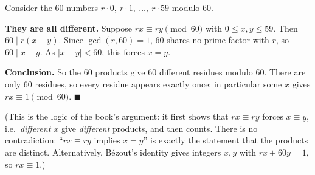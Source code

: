Consider the $60$ numbers $r\cdot0,\ r\cdot1,\ \ldots,\ r\cdot59$ modulo $60$.

\textbf{They are all different.} Suppose $rx\equiv ry\pmod{60}$ with $0\le x,y\le59$. Then $60\mid r(x-y)$. Since $\gcd(r,60)=1$, $60$ shares no prime factor with $r$, so $60\mid x-y$. As $|x-y|<60$, this forces $x=y$.

\textbf{Conclusion.} So the $60$ products give $60$ different residues modulo $60$. There are only $60$ residues, so every residue appears exactly once; in particular some $x$ gives $rx\equiv1\pmod{60}$. $\blacksquare$

(This is the logic of the book's argument: it first shows that $rx\equiv ry$ forces $x\equiv y$, i.e.\ \emph{different} $x$ give \emph{different} products, and then counts. There is no contradiction: ``$rx\equiv ry$ implies $x=y$'' is exactly the statement that the products are distinct. Alternatively, B\'ezout's identity gives integers $x,y$ with $rx+60y=1$, so $rx\equiv1$.)
